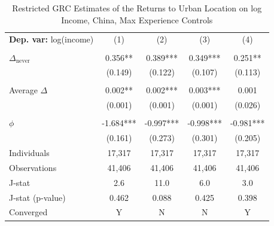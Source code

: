 \begin{table}[htbp] \centering \begin{threeparttable}
 \caption{Restricted GRC Estimates of the Returns to Urban Location on log Income, China, Max Experience Controls} 
 \label{tab:GRC_CHN_income_urban_unb_exp_max} 
\begin{tabular}{l cccc} \toprule  \textbf{Dep. var:}  log(income) 
                    &\multicolumn{1}{c}{(1)}   &\multicolumn{1}{c}{(2)}   &\multicolumn{1}{c}{(3)}   &\multicolumn{1}{c}{(4)}   \\
                    &               &               &               &               \\
\addlinespace
$\Delta_{\text{never}}$&       0.356** &       0.389***&       0.349***&       0.251** \\
                    &     (0.149)   &     (0.122)   &     (0.107)   &     (0.113)   \\
                    &               &               &               &               \\
\addlinespace
Average $\Delta$    &       0.002** &       0.002***&       0.003***&       0.001   \\
                    &     (0.001)   &     (0.001)   &     (0.001)   &     (0.026)   \\
                    &               &               &               &               \\
\addlinespace
$\phi$              &      -1.684***&      -0.997***&      -0.998***&      -0.981***\\
                    &     (0.161)   &     (0.273)   &     (0.301)   &     (0.205)   \\
\addlinespace
Individuals         &      17,317   &      17,317   &      17,317   &      17,317   \\
Observations        &      41,406   &      41,406   &      41,406   &      41,406   \\
J-stat              &         2.6   &        11.0   &         6.0   &         3.0   \\
J-stat (p-value)    &       0.462   &       0.088   &       0.425   &       0.398   \\
Converged           &           Y   &           N   &           N   &           Y   \\

\end{tabular}
\end{threeparttable}
\end{table}

